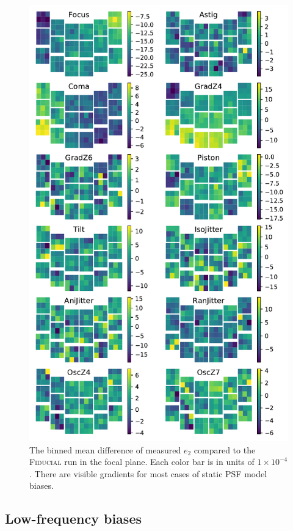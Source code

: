 \documentclass[usenatbib]{mnras}
\begin{document}
\begin{figure}
\begin{center}
\includegraphics[width=\columnwidth]{figures/focal_mean_e2.pdf}
\end{center}
\caption[]{
The binned mean difference of measured $e_2$ compared to the \textsc{Fiducial} run in the focal plane.  Each color bar is in units of $1\times 10^{-4}$. There are visible gradients for most cases of static PSF model biases.
\label{fig:focal_mean_e2}}
\end{figure}

\subsection{Low-frequency biases}\label{sec:high}
\end{document}
